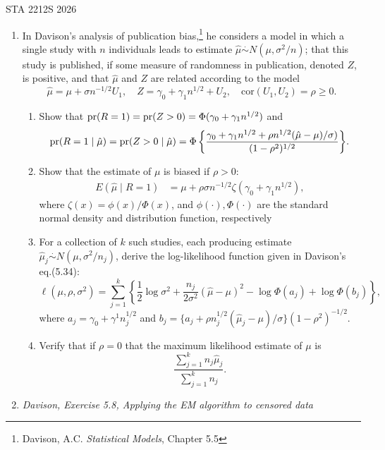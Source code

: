 \documentclass[12pt]{article}
\def\dotsim{\stackrel{.}{\sim}}
\def\pr{{\rm pr}}
\newcommand{\1}{\mathds 1}
\begin{document}
 {\hfill STA 2212S 2026}\\


\bigskip

\begin{enumerate}

\item In Davison's analysis of publication bias,\footnote{Davison, A.C. {\it Statistical Models}, Chapter 5.5} he considers a model in which a single study with $n$ individuals leads to estimate $\hat\mu \dotsim N(\mu, \sigma^2/n)$; that this study is published, if some measure of randomness in publication, denoted $Z$, is positive, 
	and that $\hat\mu$ and $Z$ are related according to the model  $$\hat\mu = \mu + \sigma n^{-1/2} U_1, \quad Z = \gamma_0 + \gamma_1n^{1/2} + U_2, \quad \text{cor}(U_1,U_2)=\rho \ge 0.$$ 
	\begin{enumerate}
	\item Show that $\pr(R=1) = \pr(Z > 0) = \Phi(\gamma_0+\gamma_1n^{1/2})$ and 
	$$\displaystyle{\pr(R=1\mid\hat\mu) = \pr(Z > 0 \mid \hat\mu) = \Phi\left\{\frac{\gamma_0 + \gamma_1n^{1/2} + \rho n^{1/2}(\hat\mu-\mu)/\sigma)}{(1-\rho^2)^{1/2}}\right\}}.$$  
	\item  Show that the estimate of $\mu$ is biased if $\rho>0$: \begin{align*}E(\hat\mu \mid R=1) &= \mu+\rho\sigma n^{-1/2}\zeta(\gamma_0+\gamma_1 n^{1/2}), %
	\end{align*} where $\zeta(x) = \phi(x)/\Phi(x)$, and $\phi(\cdot), \Phi(\cdot)$ are the standard normal density and distribution function, respectively
	\item For a collection of $k$ such studies, each producing estimate $\hat\mu_j \dotsim N(\mu, \sigma^2/n_j)$, derive the log-likelihood function given in Davison's eq.(5.34): $$ \ell(\mu,\rho, \sigma^2) = \sum_{j=1}^k \left\{\frac{1}{2}\log\sigma^2 + \frac{n_j}{2\sigma^2}(\hat\mu-\mu)^2 - \log\Phi(a_j)+\log\Phi(b_j) \right\}, $$
	where $a_j = \gamma_0+\gamma^1n_j^{1/2}$ and $ b_j = \{a_j+\rho n_j^{1/2}(\hat\mu_j-\mu)/\sigma\}(1-\rho^2)^{-1/2}$.
	\item Verify that if $\rho=0$ that the maximum likelihood estimate of $\mu$ is $$\frac{\sum_{j=1}^k n_j\hat\mu_j}{\sum_{j=1}^k n_j}.$$
\end{enumerate}
\item{\it Davison, Exercise 5.8, Applying the EM algorithm to censored data}

\end{enumerate}
\end{document}
